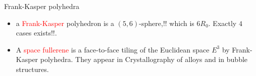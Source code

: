 \documentclass[%
pdf,
colorBG,
slideColor,
]{prosper}
\begin{document}
\begin{slide}{Frank-Kasper polyhedra}
\begin{itemize}
\item a \textcolor{red}{Frank-Kasper} polyhedron is a $(5,6)$-sphere,!! 
which is $6R_0$. Exactly $4$ cases exists!!.
\item A \textcolor{red}{space fullerene} is a face-to-face tiling of the Euclidean space $E^3$ by Frank-Kasper polyhedra. They appear in Crystallography of alloys and in bubble structures.
\end{itemize}

\begin{center}
\begin{minipage}{4.5cm}
\begin{minipage}{20mm}
\centering
\epsfxsize=17mm
\par
\end{minipage}
\hfill\begin{minipage}{20mm}
\centering
\epsfxsize=20mm
\par
\end{minipage}
\begin{minipage}{20mm}
\centering
\epsfxsize=20mm
\par
\end{minipage}
\hfill\begin{minipage}{20mm}
\centering
\epsfxsize=20mm
\par
\end{minipage}
\end{minipage}
\begin{minipage}{4.5cm}
\centering
{}\par
\end{minipage}
\end{center}

\end{slide}
\end{document}
